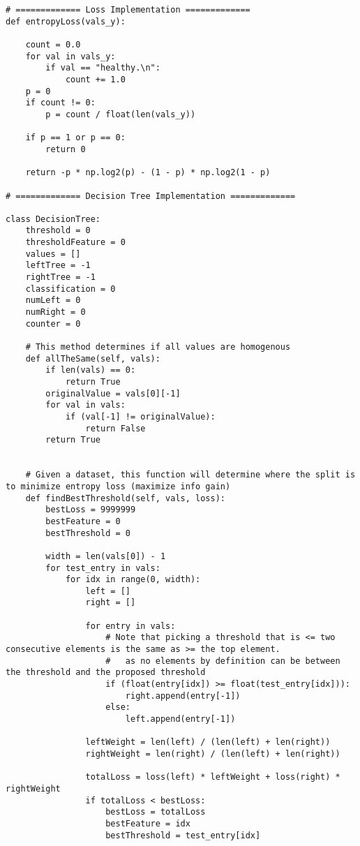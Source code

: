 \documentclass{article}
\begin{document}
\begin{titlepage}
\begin{lstlisting}
# ============= Loss Implementation =============
def entropyLoss(vals_y):

    count = 0.0
    for val in vals_y:
        if val == "healthy.\n":
            count += 1.0
    p = 0
    if count != 0:
        p = count / float(len(vals_y))

    if p == 1 or p == 0:
        return 0

    return -p * np.log2(p) - (1 - p) * np.log2(1 - p)

# ============= Decision Tree Implementation =============

class DecisionTree:
    threshold = 0
    thresholdFeature = 0
    values = []
    leftTree = -1
    rightTree = -1
    classification = 0
    numLeft = 0
    numRight = 0
    counter = 0

    # This method determines if all values are homogenous
    def allTheSame(self, vals):
        if len(vals) == 0:
            return True
        originalValue = vals[0][-1]
        for val in vals:
            if (val[-1] != originalValue):
                return False
        return True


    # Given a dataset, this function will determine where the split is to minimize entropy loss (maximize info gain)
    def findBestThreshold(self, vals, loss):
        bestLoss = 9999999
        bestFeature = 0
        bestThreshold = 0

        width = len(vals[0]) - 1
        for test_entry in vals:
            for idx in range(0, width):
                left = []
                right = []

                for entry in vals:
                    # Note that picking a threshold that is <= two consecutive elements is the same as >= the top element.
                    #   as no elements by definition can be between the threshold and the proposed threshold
                    if (float(entry[idx]) >= float(test_entry[idx])):
                        right.append(entry[-1])
                    else:
                        left.append(entry[-1])

                leftWeight = len(left) / (len(left) + len(right))
                rightWeight = len(right) / (len(left) + len(right))

                totalLoss = loss(left) * leftWeight + loss(right) * rightWeight
                if totalLoss < bestLoss:
                    bestLoss = totalLoss
                    bestFeature = idx
                    bestThreshold = test_entry[idx]


\end{lstlisting}
\end{titlepage}
\end{document}
